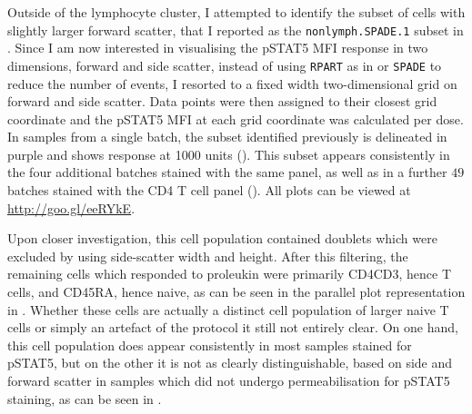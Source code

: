 Outside of the lymphocyte cluster, I attempted to identify the subset of cells with slightly larger forward scatter, that I reported as the \texttt{nonlymph.SPADE.1} subset in .
Since I am now interested in visualising the pSTAT5 MFI response in two dimensions, forward and side scatter, instead of using \texttt{RPART} as in  or \texttt{SPADE} to reduce the number of events, I resorted to a fixed width two-dimensional grid on forward and side scatter.
Data points were then assigned to their closest grid coordinate and the pSTAT5 MFI at each grid coordinate was calculated per dose.
In samples from a single batch, the subset identified previously is delineated in purple and shows response at 1000 units ().
This subset appears consistently in the four additional batches stained with the same panel,
as well as in a further $49$ batches stained with the CD4 T cell panel ().
All plots can be viewed at \url{http://goo.gl/eeRYkE}.

Upon closer investigation, this cell population contained doublets which were excluded by using side-scatter width and height.
After this filtering, the remaining cells which responded to proleukin were primarily CD4\positive CD3\positive, hence T cells, and CD45RA\positive, hence naive, as can be seen in the parallel plot representation in .
Whether these cells are actually a distinct cell population of larger naive T cells or simply an artefact of the protocol it still not entirely clear.
On one hand, this cell population does appear consistently in most samples stained for pSTAT5, but on the other it is not as clearly distinguishable, based on side and forward scatter in samples which did not undergo permeabilisation for pSTAT5 staining, as can be seen in .


